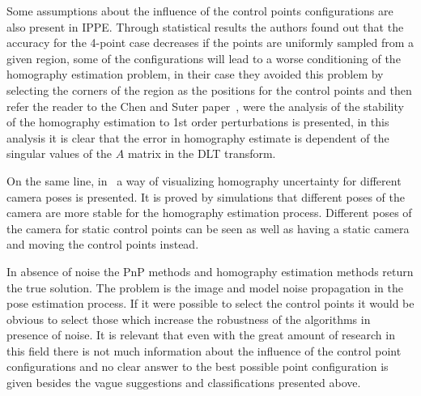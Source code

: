 \documentclass[letterpaper, 10 pt, conference]{ieeeconf}  %
\begin{document}
Some assumptions about the influence of the control points configurations are also present in IPPE. Through statistical results the authors found out that the accuracy for the 4-point case decreases if the points are uniformly sampled from a given region, some of the configurations will lead to a worse conditioning of the homography estimation problem, in their case they avoided this problem by selecting the corners of the region as the positions for the control points and then refer the reader to the Chen and Suter paper~\cite{Chen2009}, were the analysis of the stability of the homography estimation to 1st order perturbations is presented, in this analysis it is clear that the error in homography estimate is dependent of the singular values of the $A$ matrix in the DLT transform.

On the same line, in~\cite{Chung2014} a way of visualizing homography uncertainty for different camera poses is presented. It is proved by simulations that different poses of the camera are more stable for the homography estimation process. Different poses of the camera for static control points can be seen as well as having a static camera and moving the control points instead.





In absence of noise the PnP methods and homography estimation methods return the true solution. The problem is the image and model noise propagation in the pose estimation process. If it were possible to select the control points it would be obvious to select those which increase the robustness of the algorithms in presence of noise. It is relevant that even with the great amount of research in this field there is not much information about the influence of the control point configurations and no clear answer to the best possible point configuration is given besides the vague suggestions and classifications presented above. 
\end{document}

